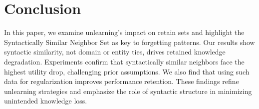 \section{Conclusion}
In this paper, we examine unlearning's impact on retain sets and highlight the Syntactically Similar Neighbor Set as key to forgetting patterns. Our results show syntactic similarity, not domain or entity ties, drives retained knowledge degradation. Experiments confirm that syntactically similar neighbors face the highest utility drop, challenging prior assumptions. We also find that using such data for regularization improves performance retention. These findings refine unlearning strategies and emphasize the role of syntactic structure in minimizing unintended knowledge loss.

